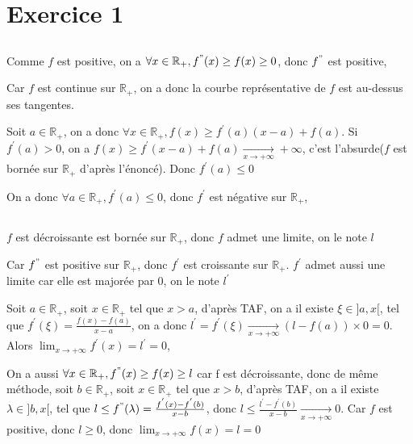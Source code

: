 \documentclass[a4paper,12pt]{book}
\begin{document}
\renewcommand{\labelitemi}{$\blacktriangleright$}
\renewcommand{\labelitemii}{$\bullet$}


\section{Exercice 1}
\subsection{}
Comme $f$ est positive, on a $\forall x \in \mathbb{R}_+, f^{"}(x)\geq f(x)\geq 0$, 
donc $f^{"}$ est positive, 

Car $f$ est continue sur $\mathbb{R}_+$, on a donc la courbe représentative de $f$ est au-dessus ses tangentes. 

Soit $a \in \mathbb{R}_+$, on a donc $\forall x \in \mathbb{R}_+, f(x) \geq f^{'}(a)(x-a)+f(a)$. Si $f^{'}(a) >0$, on a 
$f(x)\geq f^{'}(x-a)+f(a)\xrightarrow[x \to +\infty]{}  +\infty$, c'est l'absurde($f$ est bornée sur $\mathbb{R}_+$ d'après l'énoncé). Donc $f^{'}(a)\leq 0$ 

On a donc $\forall a \in \mathbb{R}_+, f^{'}(a)\leq 0$, donc $f^{'}$ est négative sur $\mathbb{R}_+$, 

\subsection{}

$f$ est décroissante est bornée sur $\mathbb{R}_+$, donc $f$ admet une limite, on le note $l$

Car $f^{"}$ est positive sur $\mathbb{R}_+$, donc $f^{'}$ est croissante sur $\mathbb{R}_+$. $f^{'}$ admet aussi une limite car elle est majorée par $0$, on le note $l^{'}$

Soit $a \in \mathbb{R}_+$, soit $x\in \mathbb{R}_+$ tel que $x>a$, d'après TAF, on a il existe $\xi \in ]a,x[$, tel que $f^{'}(\xi)=\frac{f(x)-f(a)}{x-a}$, 
on a donc $l^{'}=f^{'}(\xi)\xrightarrow[x \to +\infty]{}(l-f(a))\times 0=0$. Alors $\boxed{\lim_{x \to +\infty}f^{'}(x)=l^{'}=0}$,  

On a aussi $\forall x\in \mathbb{R}_+,f^{"}(x)\geq f(x)\geq l$ car f est décroissante, donc de même méthode,  
soit $b \in \mathbb{R}_+$, soit $x\in \mathbb{R}_+$ tel que $x>b$, d'après TAF, on a il existe $\lambda \in ]b,x[$, tel que $l\leq f^{"}(\lambda)=\frac{f^{'}(x)-f^{'}(b)}{x-b}$, 
donc $l \leq \frac{l^{'}-f^{'}(b)}{x-b} \xrightarrow[x \to +\infty]{}0$. Car $f$ est positive, donc $l \geq 0$, donc $\boxed{\lim_{x \to +\infty}f(x)=l=0}$
\end{document}
